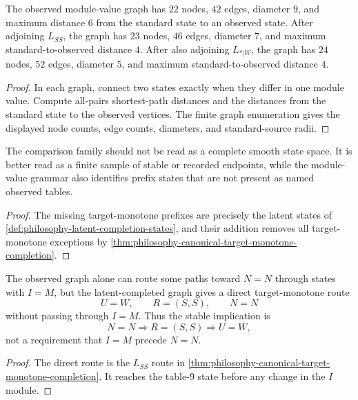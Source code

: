 \begin{theorem}
\label{thm:philosophy-latent-completion-graph-compression}
The observed module-value graph has $22$ nodes, $42$ edges, diameter
$9$, and maximum distance $6$ from the standard state to an observed
state. After adjoining $L_{SS}$, the graph has $23$ nodes, $46$ edges,
diameter $7$, and maximum standard-to-observed distance $4$. After also
adjoining $L_{*|W}$, the graph has $24$ nodes, $52$ edges, diameter $5$,
and maximum standard-to-observed distance $4$.
\end{theorem}
\begin{proof}
In each graph, connect two states exactly when they differ in one module
value. Compute all-pairs shortest-path distances and the distances from
the standard state to the observed vertices. The finite graph
enumeration gives the displayed node counts, edge counts, diameters, and
standard-source radii.
\end{proof}

\begin{corollary}
\label{cor:philosophy-observed-states-as-sampled-endpoints}
The comparison family should not be read as a complete smooth state
space. It is better read as a finite sample of stable or recorded
endpoints, while the module-value grammar also identifies prefix states
that are not present as named observed tables.
\end{corollary}
\begin{proof}
The missing target-monotone prefixes are precisely the latent states of
\autoref{def:philosophy-latent-completion-states}, and their addition
removes all target-monotone exceptions by
\autoref{thm:philosophy-canonical-target-monotone-completion}.
\end{proof}

\begin{corollary}
\label{cor:philosophy-aua-detour-not-forced-premise}
The observed graph alone can route some paths toward $N=N$ through
states with $I=M$, but the latent-completed graph gives a direct
target-monotone route
$$
  U=W,\qquad R=(S,S),\qquad N=N
$$
without passing through $I=M$. Thus the stable implication is
$$
  N=N\Rightarrow R=(S,S)\Rightarrow U=W,
$$
not a requirement that $I=M$ precede $N=N$.
\end{corollary}
\begin{proof}
The direct route is the $L_{SS}$ route in
\autoref{thm:philosophy-canonical-target-monotone-completion}. It reaches the
table-$9$ state before any change in the $I$ module.
\end{proof}

